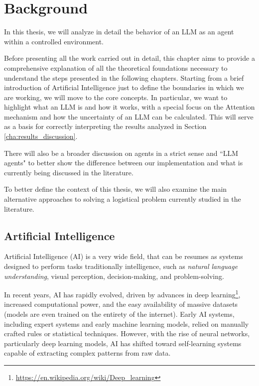 \chapter{Background}
\label{cha:background}

In this thesis, we will analyze in detail the behavior of an LLM as an agent within
a controlled environment.

Before presenting all the work carried out in detail, this chapter aims to
provide a comprehensive explanation of all the theoretical foundations necessary
to understand the steps presented in the following chapters. Starting from a brief
introduction of Artificial Intelligence just to define the boundaries in which we
are working, we will move to the core concepts. In particular, we want to
highlight what an LLM is and how it works, with a special focus on the Attention
mechanism and how the uncertainty of an LLM can be calculated. This will serve
as a basis for correctly interpreting the results analyzed in Section
\ref{cha:results_discussion}.

There will also be a broader discussion on agents in a strict sense and ``LLM
agents" to better show the difference between our implementation and what is currently
being discussed in the literature.

To better define the context of this thesis, we will also examine the main
alternative approaches to solving a logistical problem currently studied in the
literature.

\section{Artificial Intelligence}
\label{sec:artificial_intelligence}

Artificial Intelligence (AI) is a very wide field, that can be resumes as
systems designed to perform tasks traditionally intelligence, such as \emph{natural
language understanding}, visual perception, decision-making, and problem-solving.

In recent years, AI has rapidly evolved, driven by advances in deep learning\footnote{\url{https://en.wikipedia.org/wiki/Deep_learning}},
increased computational power, and the easy availability of massive datasets (models
are even trained on the entirety of the internet). Early AI systems, including
expert systems and early machine learning models, relied on manually crafted rules
or statistical techniques. However, with the rise of neural networks,
particularly deep learning models, AI has shifted toward self-learning systems capable
of extracting complex patterns from raw data.

